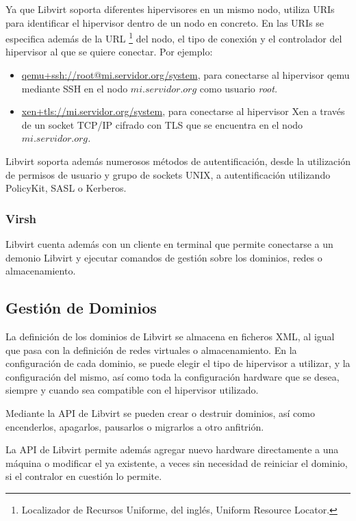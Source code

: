 \documentclass[spanisheDIVcalc,twoside,parskip-,pointlessnumbers,final]{scrbook}
\begin{document}
Ya que Libvirt soporta diferentes hipervisores en un mismo nodo, utiliza
URIs para identificar el hipervisor dentro de un nodo en concreto.
En las URIs se especifica además de la URL%
\footnote{Localizador de Recursos Uniforme, del inglés, Uniform Resource Locator.%
} del nodo, el tipo de conexión y el controlador del hipervisor al
que se quiere conectar. Por ejemplo:
\begin{itemize}
\item \url{qemu+ssh://root@mi.servidor.org/system}, para conectarse al
hipervisor qemu mediante SSH en el nodo $mi.servidor.org$ como usuario
\emph{root.}
\item \url{xen+tls://mi.servidor.org/system}, para conectarse al hipervisor
Xen a través de un socket TCP/IP cifrado con TLS que se encuentra
en el nodo $mi.servidor.org$\emph{.}
\end{itemize}
Libvirt soporta además numerosos métodos de autentificación, desde
la utilización de permisos de usuario y grupo de sockets UNIX, a autentificación
utilizando PolicyKit, SASL o Kerberos.


\subsubsection{Virsh}

Libvirt cuenta además con un cliente en terminal que permite conectarse
a un demonio Libvirt y ejecutar comandos de gestión sobre los dominios,
redes o almacenamiento.


\subsection{Gestión de Dominios}

La definición de los dominios de Libvirt se almacena en ficheros XML,
al igual que pasa con la definición de redes virtuales o almacenamiento.
En la configuración de cada dominio, se puede elegir el tipo de hipervisor
a utilizar, y la configuración del mismo, así como toda la configuración
hardware que se desea, siempre y cuando sea compatible con el hipervisor
utilizado. 

Mediante la API de Libvirt se pueden crear o destruir dominios, así
como encenderlos, apagarlos, pausarlos o migrarlos a otro anfitrión.

La API de Libvirt permite además agregar nuevo hardware directamente
a una máquina o modificar el ya existente, a veces sin necesidad de
reiniciar el dominio, si el contralor en cuestión lo permite.
\end{document}
